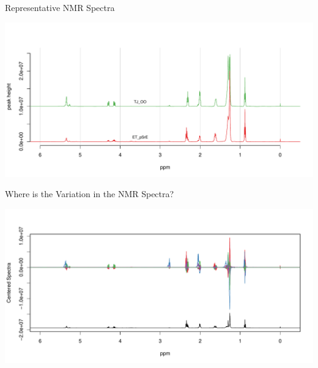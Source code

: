 \documentclass[aspectratio=169]{beamer}\usepackage[]{graphicx}\usepackage[]{color}
\makeatletter
\def\maxwidth{ %
  \ifdim\Gin@nat@width>\linewidth
    \linewidth
  \else
    \Gin@nat@width
  \fi
}
\newenvironment{knitrout}{}{} %
\makeatother
\begin{document}

\begin{frame}{Representative  NMR Spectra}

\begin{knitrout}
\color{fgcolor}
\includegraphics[width=\maxwidth]{figure/Spectra-1} 

\end{knitrout}

\end{frame}


\begin{frame}{Where is the Variation in the  NMR Spectra?}

\begin{knitrout}
\color{fgcolor}
\includegraphics[width=\maxwidth]{figure/Survey-1} 

\end{knitrout}

\end{frame}

\end{document}
